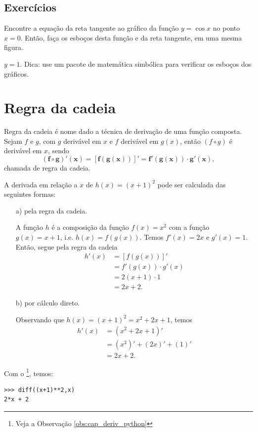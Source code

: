 \emconstrucao

\subsection*{Exercícios}

\begin{exer}
  Encontre a equação da reta tangente ao gráfico da função $y = \cos x$ no ponto $x=0$. Então, faça os esboços desta função e da reta tangente, em uma mesma figura.  
\end{exer}
\begin{resp}
  $y = 1$. Dica: use um pacote de matemática simbólica para verificar os esboços dos gráficos.
\end{resp}

\emconstrucao

\section{Regra da cadeia}\label{cap_deriv_sec_cadeia}

Regra da cadeia é nome dado a técnica de derivação de uma função composta. Sejam $f$ e $g$, com $g$ derivável em $x$ e $f$ derivável em $g(x)$, então $(f\circ g)$ é derivável em $x$, sendo
\begin{equation}
  \pmb{(f\circ g)'(x) = [f(g(x))]' = f'(g(x))\cdot g'(x)},
\end{equation}
chamada de regra da cadeia.

\begin{ex}
  A derivada em relação a $x$ de $h(x) = (x+1)^2$ pode ser calculada das seguintes formas:
  \begin{enumerate}
  \item[a)] pela regra da cadeia.

    A função $h$ é a composição da função $f(x)=x^2$ com a função $g(x)=x+1$, i.e. $h(x) = f(g(x))$. Temos $f'(x)=2x$ e $g'(x)=1$. Então, segue pela regra da cadeia
    \begin{align}
      h'(x) &= [f(g(x))]' \\
            &= f'(g(x))\cdot g'(x) \\
            &= 2(x+1)\cdot 1 \\
            &= 2x+2.
    \end{align}

  \item[b)] por cálculo direto.

    Observando que $h(x)=(x+1)^2=x^2+2x+1$, temos
    \begin{align}
      h'(x) &= (x^2+2x+1)' \\
            &= (x^2)' + (2x)' + (1)' \\
            &= 2x + 2.
    \end{align}
  \end{enumerate}

  \ifispython
  Com o \sympy\footnote{Veja a Observação \ref{obs:cap_deriv_python}}, temos:
\begin{verbatim}
>>> diff((x+1)**2,x)
2*x + 2
\end{verbatim}
  \fi  
\end{ex}

